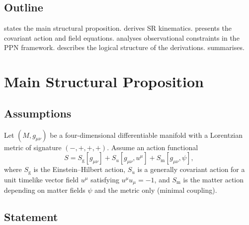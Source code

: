 \documentclass[12pt,a4paper]{article}
\newcommand{\EH}{S_{\mathrm{g}}}
\newcommand{\Su}{S_{u}}
\newcommand{\Sm}{S_{\mathrm{m}}}
\begin{document}
\subsection{Outline}

 states the main structural proposition.
 derives SR kinematics.
 presents the covariant action and field equations.
 analyses observational constraints in the PPN framework.
 describes the logical structure of the derivations.
 summarises.

\section{Main Structural Proposition}
\label{sec:proposition}


\subsection{Assumptions}

Let $(M,g_{\mu\nu})$ be a four-dimensional differentiable manifold with a
Lorentzian metric of signature $(-,+,+,+)$. Assume an action functional
\begin{equation}
  S = \EH[g_{\mu\nu}]+\Su[g_{\mu\nu},u^{\mu}]+\Sm[g_{\mu\nu},\psi],
  \label{eq:total_action}
\end{equation}
where $\EH$ is the Einstein--Hilbert action, $\Su$ is a generally covariant
action for a unit timelike vector field $u^{\mu}$ satisfying
$u^{\mu}u_{\mu}=-1$, and $\Sm$ is the matter action depending on matter
fields $\psi$ and the metric only (minimal coupling).

\subsection{Statement}
\end{document}
